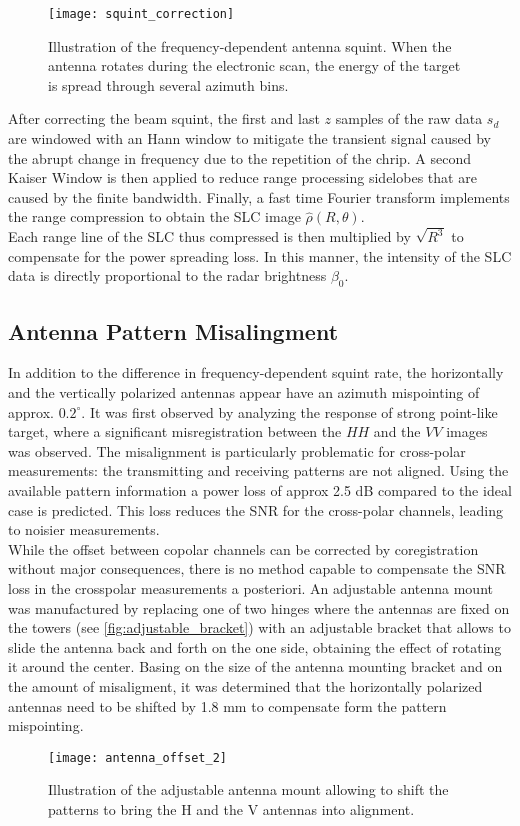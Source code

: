 \begin{figure}[ht]
	\centering
	\texttt{[image: squint\_correction]}
	\caption{Illustration of the frequency-dependent antenna squint. When the antenna rotates during the electronic scan, the energy of the target is spread through several azimuth bins.}
	\label{fig:squint_correction}
\end{figure}
After correcting the beam squint, the first and last $z$ samples of the raw data $s_{d}$ are windowed with an Hann window to mitigate the transient signal caused by the abrupt change in frequency due to the repetition of the chrip. A second Kaiser Window is then applied to reduce range processing sidelobes that are caused by the finite bandwidth. Finally, a fast time Fourier transform implements the range compression to obtain the SLC image $\hat{\rho}\left(R, \theta\right)$.\\ Each range line of the SLC thus compressed is then multiplied by $\sqrt{R^3}$ to compensate for the power spreading loss. In this manner, the intensity of the SLC data is directly proportional to the radar brightness $\beta_{0}$.
\subsection{Antenna Pattern Misalingment}\label{sec:misalingment}
In addition to the difference in frequency-dependent squint rate, the horizontally and the vertically polarized antennas appear have an azimuth mispointing of approx. $0.2^\circ$. It was first observed by analyzing the response of strong point-like target, where a significant misregistration between the $HH$ and the $VV$ images was observed. The misalignment is particularly problematic for cross-polar measurements: the transmitting and receiving patterns are not aligned. Using the available pattern information a power loss of approx 2.5 dB  compared to the ideal case is predicted. This loss reduces the SNR for the cross-polar channels, leading to noisier measurements.\\ While the offset between copolar channels can be corrected by coregistration without major consequences, there is no method capable to compensate the SNR loss in the crosspolar measurements a posteriori. An adjustable antenna mount was manufactured by replacing one of two hinges where the antennas are fixed on the towers (see \autoref{fig:adjustable_bracket}) with an adjustable bracket that allows to slide the antenna back and forth on the one side, obtaining the effect of rotating it around the center. Basing on the size of the antenna mounting bracket and on the amount of misaligment, it was determined that the horizontally polarized antennas need to be shifted by 1.8 mm to compensate form the pattern mispointing.
\begin{figure}[ht]
	\centering
	\texttt{[image: antenna\_offset\_2]}
	\caption{Illustration of the adjustable antenna mount allowing to shift the patterns to bring the H and the V antennas into alignment.}
	\label{fig:adjustable_bracket}
\end{figure}
